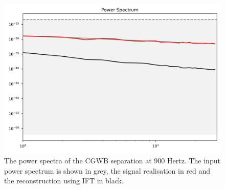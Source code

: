 \begin{figure}[h]
    \centering
    \includegraphics[width=0.8\linewidth]{Images/power_spectrum_cosmo_900Hz_2D.png}
    \caption{The power spectra of the CGWB separation at 900 Hertz. The input power spectrum is shown in grey, the signal realisation in red and the reconstruction using IFT in black.}
    \label{cosmo_power_spectrum_nifty}
\end{figure} 